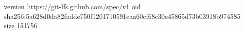 version https://git-lfs.github.com/spec/v1
oid sha256:5a628d0da82fadde750f1201710591eaa60cf68c30e45865d73b03918b974585
size 151756
